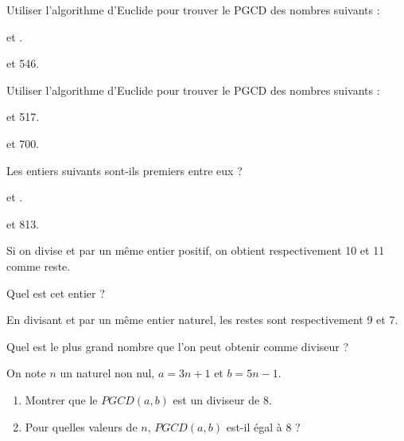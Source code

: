 \documentclass{cornouaille}
\begin{document}
\begin{exercice}
  Utiliser l'algorithme d'Euclide pour trouver le PGCD des nombres
  suivants :
\begin{colenumerate}{2}
\item {} et . 
\item {} et 546.
\end{colenumerate}
\end{exercice}

\begin{exercice}
  Utiliser l'algorithme d'Euclide pour trouver le PGCD des nombres
  suivants :
\begin{colenumerate}{2}
\item {} et 517. 
\item {} et 700.
\end{colenumerate}
\end{exercice}

\begin{exercice}
Les entiers suivants sont-ils premiers entre eux ?
\begin{colenumerate}{2}
\item {} et . 
\item {} et 813.
\end{colenumerate}
\end{exercice}

\begin{exercice}
  Si on divise  et  par un même entier
  positif, on obtient respectivement 10 et 11 comme reste.

  Quel est cet entier ?
\end{exercice}

\begin{exercice}
  En divisant  et  par un même entier
  naturel, les restes sont respectivement 9 et 7. 

  Quel est le plus grand nombre que l'on peut obtenir comme diviseur ?
\end{exercice}

\begin{exercice}
On note $n$ un naturel non nul, $a=3n+1$ et $b=5n-1$.
\begin{enumerate}
\item Montrer que le $PGCD(a,b)$ est un diviseur de 8.
\item Pour quelles valeurs de $n$, $PGCD(a,b)$ est-il égal à 8 ?
\end{enumerate}
\end{exercice}
\end{document}
